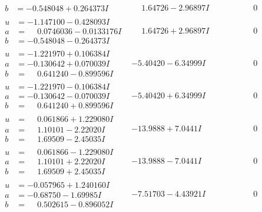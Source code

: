 \documentclass[1p]{elsarticle_modified}
\theoremstyle{definition}
\begin{document}
$$\begin{array}{c|c|c}
\begin{aligned}
b &= -0.548048 + 0.264373 I\end{aligned}
 & \phantom{-}1.64726 - 2.96897 I & \phantom{-0.000000 } 0 \\ \hline\begin{aligned}
u &= -1.147100 - 0.428093 I \\
a &= \phantom{-}0.0746036 - 0.0133176 I \\
b &= -0.548048 - 0.264373 I\end{aligned}
 & \phantom{-}1.64726 + 2.96897 I & \phantom{-0.000000 } 0 \\ \hline\begin{aligned}
u &= -1.221970 + 0.106384 I \\
a &= -0.130642 + 0.070039 I \\
b &= \phantom{-}0.641240 - 0.899596 I\end{aligned}
 & -5.40420 - 6.34999 I & \phantom{-0.000000 } 0 \\ \hline\begin{aligned}
u &= -1.221970 - 0.106384 I \\
a &= -0.130642 - 0.070039 I \\
b &= \phantom{-}0.641240 + 0.899596 I\end{aligned}
 & -5.40420 + 6.34999 I & \phantom{-0.000000 } 0 \\ \hline\begin{aligned}
u &= \phantom{-}0.061866 + 1.229080 I \\
a &= \phantom{-}1.10101 - 2.22020 I \\
b &= \phantom{-}1.69509 - 2.45035 I\end{aligned}
 & -13.9888 + 7.0441 I & \phantom{-0.000000 } 0 \\ \hline\begin{aligned}
u &= \phantom{-}0.061866 - 1.229080 I \\
a &= \phantom{-}1.10101 + 2.22020 I \\
b &= \phantom{-}1.69509 + 2.45035 I\end{aligned}
 & -13.9888 - 7.0441 I & \phantom{-0.000000 } 0 \\ \hline\begin{aligned}
u &= -0.057965 + 1.240160 I \\
a &= -0.68750 - 1.69985 I \\
b &= \phantom{-}0.502615 - 0.896052 I\end{aligned}
 & -7.51703 - 4.43921 I & \phantom{-0.000000 } 0 \\ \hline\begin{aligned}

\end{aligned}
\end{array}$$
\end{document}
